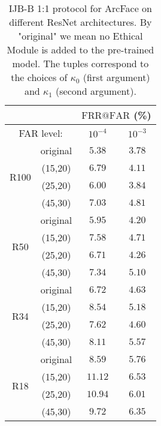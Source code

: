 \documentclass[nohyperref]{article}
\theoremstyle{plain}
\theoremstyle{definition}
\theoremstyle{remark}
\begin{document}
\begin{table}
\centering
\caption{IJB-B 1:1 protocol for ArcFace on different ResNet architectures. By "original" we mean no Ethical Module is added to the pre-trained model. The tuples correspond to the choices of $\kappa_0$ (first argument) and $\kappa_1$ (second argument).}
\begin{tabular}{ c | c | c | c}

 & & \multicolumn{2}{c}{$\mathrm{FRR}@\mathrm{FAR}$ (\%)} \\ \hline \hline
 \multicolumn{2}{c}{ FAR level: }         & $10^{-4}$ & $10^{-3}$ \\  
 \hline \hline
                              & original  & $5.38$ & $3.78$  \\
  \multirow{2}{*}{R100}       & (15,20) & $6.79$ & $4.11$  \\
                              & (25,20) & $6.00$ & $3.84$  \\
                              & (45,30) & $7.03$ & $4.81$  \\ \hline     
                              & original  & $5.95$ & $4.20$  \\
  \multirow{2}{*}{R50}        & (15,20) & $7.58$ & $4.71$  \\
                              & (25,20) & $6.71$ & $4.26$  \\
                              & (45,30) & $7.34$ & $5.10$  \\ \hline 
                              & original  & $6.72$ & $4.63$  \\
\multirow{2}{*}{R34}          & (15,20) & $8.54$ & $5.18$  \\
                              & (25,20) & $7.62$ & $4.60$  \\
                              & (45,30) & $8.11$ & $5.57$  \\ \hline 
                              & original  & $8.59$ & $5.76$  \\
  \multirow{2}{*}{R18}        & (15,20) & $11.12$& $6.53$  \\
                              & (25,20) & $10.94$& $6.01$ \\
                              & (45,30) & $9.72$ & $6.35$  \\ \hline 
\end{tabular}
\label{tab:table8}
\end{table}
\end{document}
